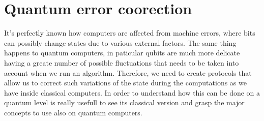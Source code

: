\section{Quantum error coorection}

It's perfectly known how computers are affected from machine errors, where bits can possibly change states due to various external factors. The same thing happens to quantum computers, in paticular qubits are much more delicate having a greate number of possible fluctuations that needs to be taken into account when we run an algorithm. Therefore, we need to create protocols that allow us to correct such variations of the state during the computations as we have inside classical computers. In order to understand how this can be done on a quantum level is really usefull to see its classical version and grasp the major concepts to use also on quantum computers.

